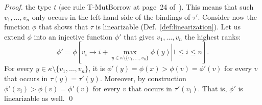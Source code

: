 \begin{proof}
  the type $t$ (see rule \textsf{T-MutBorrow} at page~24 of~\cite{Pearce21}).
  This means that such $v_1,\ldots,v_n$ only occurs in the left-hand side of the bindings of $\tau'$.
  Consider now the function $\phi$ that shows that $\tau$ is linearizable (Def.~\ref{def:linearization}).
  Let us extend $\phi$ into an injective function $\phi'$ that gives $v_1,\ldots,v_n$ the highest ranks:
  \[
  \phi'=\phi\left[\left.v_i\to i+\max\limits_{y\in\kappa\setminus\{v_1,\ldots,v_n\}}\phi(y)\right|1\le i\le n\right].
  \]
  For every $y\in\kappa\setminus\{v_1,\ldots,v_n\}$, it is
  $\phi'(y)=\phi(x)>\phi(v)=\phi'(v)$ for every $v$ that occurs in $\tau(y)=\tau'(y)$.
  Moreover, by construction $\phi'(v_i)>\phi(v)=\phi'(v)$ for every $v$ that occurs in $\tau'(v_i)$.
  That is, $\phi'$ is linearizable as well.
  \qed
\end{proof}
